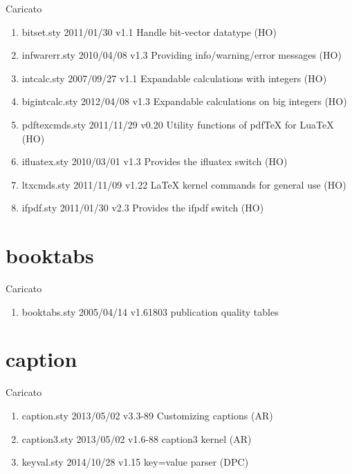 Caricato 
\begin{enumerate}
 \item bitset.sty 2011/01/30 v1.1 Handle bit-vector datatype (HO)
 \item infwarerr.sty 2010/04/08 v1.3 Providing info/warning/error messages (HO)
 \item intcalc.sty 2007/09/27 v1.1 Expandable calculations with integers (HO)
 \item bigintcalc.sty 2012/04/08 v1.3 Expandable calculations on big integers (HO)
 \item pdftexcmds.sty 2011/11/29 v0.20 Utility functions of pdfTeX for LuaTeX (HO)
 \item ifluatex.sty 2010/03/01 v1.3 Provides the ifluatex switch (HO)
 \item ltxcmds.sty 2011/11/09 v1.22 LaTeX kernel commands for general use (HO)
 \item ifpdf.sty 2011/01/30 v2.3 Provides the ifpdf switch (HO)
\end{enumerate}
\section{booktabs}

Caricato 
\begin{enumerate}
\item booktabs.sty 2005/04/14 v1.61803 publication quality tables
\end{enumerate}
\section{caption}

Caricato
\begin{enumerate}
\item  caption.sty 2013/05/02 v3.3-89 Customizing captions (AR)
\item caption3.sty 2013/05/02 v1.6-88 caption3 kernel (AR)
\item keyval.sty 2014/10/28 v1.15 key=value parser (DPC)
\end{enumerate}
